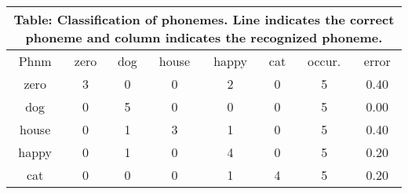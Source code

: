 \documentclass[10pt]{article}
\begin{document}
\tiny
\begin{tabular}{|@{}c@{}||@{}c@{}|@{}c@{}|@{}c@{}|@{}c@{}|@{}c@{}|@{}c@{}|@{}c@{}|}
\hline
\multicolumn{8}{c}{Table: Classification of phonemes. Line indicates the correct phoneme and column indicates the recognized phoneme.} \\ \hline \hline
Phnm & zero & dog & house & happy & cat & occur. & error \\ \hline
zero & 3 & 0 & 0 & 2 & 0 & 5 & 0.40 \\ \hline
dog & 0 & 5 & 0 & 0 & 0 & 5 & 0.00 \\ \hline
house & 0 & 1 & 3 & 1 & 0 & 5 & 0.40 \\ \hline
happy & 0 & 1 & 0 & 4 & 0 & 5 & 0.20 \\ \hline
cat & 0 & 0 & 0 & 1 & 4 & 5 & 0.20 \\ \hline
\end{tabular}
\end{document}
